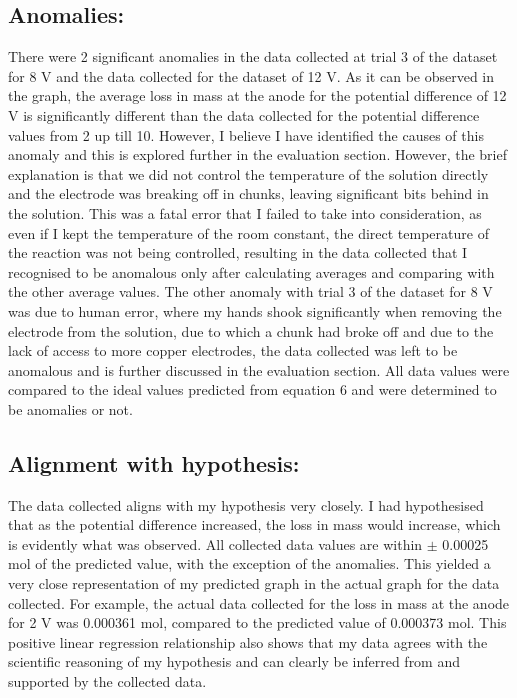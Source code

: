\documentclass[11pt, a4]{article}
\begin{document}
		\subsection{Anomalies:}
			There were 2 significant anomalies in the data collected at trial 3 of the dataset for 8 V and the data collected for the dataset of 12 V. As it can be observed in the graph, the average loss in mass at the anode for the potential difference of 12 V is significantly different than the data collected for the potential difference values from 2 up till 10. However, I believe I have identified the causes of this anomaly and this is explored further in the evaluation section. However, the brief explanation is that we did not control the temperature of the solution directly and the electrode was breaking off in chunks, leaving significant bits behind in the solution. This was a fatal error that I failed to take into consideration, as even if I kept the temperature of the room constant, the direct temperature of the reaction was not being controlled, resulting in the data collected that I recognised to be anomalous only after calculating averages and comparing with the other average values. The other anomaly with trial 3 of the dataset for 8 V was due to human error, where my hands shook significantly when removing the electrode from the solution, due to which a chunk had broke off and due to the lack of access to more copper electrodes, the data collected was left to be anomalous and is further discussed in the evaluation section. All data values were compared to the ideal values predicted from equation 6 and were determined to be anomalies or not.
			
		\subsection{Alignment with hypothesis:}
			The data collected aligns with my hypothesis very closely. I had hypothesised that as the potential difference increased, the loss in mass would increase, which is evidently what was observed. All collected data values are within $\pm$ 0.00025 mol of the predicted value, with the exception of the anomalies. This yielded a very close representation of my predicted graph in the actual graph for the data collected. For example, the actual data collected for the loss in mass at the anode for 2 V was 0.000361 mol, compared to the predicted value of 0.000373 mol. This positive linear regression relationship also shows that my data agrees with the scientific reasoning of my hypothesis and can clearly be inferred from and supported by the collected data.
			
\end{document}

